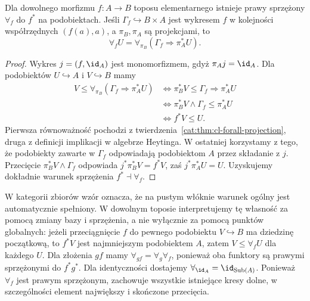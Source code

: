 \begin{twierdzenie}\label{cat:thm:cl-forall-adjoint}
Dla dowolnego morfizmu $f:A\to B$ toposu elementarnego istnieje prawy sprzężony $\forall_f$ do $f^*$ na podobiektach. Jeśli $\Gamma_f\hookrightarrow B\times A$ jest wykresem $f$ w kolejności współrzędnych $(f(a),a)$, a $\pi_B,\pi_A$ są projekcjami, to
\[
 \forall_f U=\forall_{\pi_B}(\Gamma_f\Rightarrow\pi_A^*U).
\]
\end{twierdzenie}
\begin{proof}
Wykres $j=(f,\id_A)$ jest monomorfizmem, gdyż $\pi_Aj=\id_A$. Dla podobiektów $U\hookrightarrow A$ i $V\hookrightarrow B$ mamy
\[
\begin{aligned}
 V\leq\forall_{\pi_B}(\Gamma_f\Rightarrow\pi_A^*U)
 &\iff \pi_B^*V\leq\Gamma_f\Rightarrow\pi_A^*U\\
 &\iff \pi_B^*V\wedge\Gamma_f\leq\pi_A^*U\\
 &\iff f^*V\leq U .
\end{aligned}
\]
Pierwsza równoważność pochodzi z twierdzenia~\ref{cat:thm:cl-forall-projection}, druga z definicji implikacji w algebrze Heytinga. W ostatniej korzystamy z tego, że podobiekty zawarte w $\Gamma_f$ odpowiadają podobiektom $A$ przez składanie z $j$. Przecięcie $\pi_B^*V\wedge\Gamma_f$ odpowiada $j^*\pi_B^*V=f^*V$, zaś $j^*\pi_A^*U=U$. Uzyskujemy dokładnie warunek sprzężenia $f^*\dashv\forall_f$.
\end{proof}

W kategorii zbiorów wzór oznacza, że na pustym włóknie warunek ogólny jest automatycznie spełniony. W dowolnym toposie interpretujemy tę własność za pomocą zmiany bazy i sprzężenia, a nie wyłącznie za pomocą punktów globalnych: jeżeli przeciągnięcie $f$ do pewnego podobiektu $V\hookrightarrow B$ ma dziedzinę początkową, to $f^*V$ jest najmniejszym podobiektem $A$, zatem $V\leq\forall_f U$ dla każdego $U$. Dla złożenia $gf$ mamy $\forall_{gf}=\forall_g\forall_f$, ponieważ oba funktory są prawymi sprzężonymi do $f^*g^*$. Dla identyczności dostajemy $\forall_{\id_A}=\id_{\operatorname{Sub}(A)}$. Ponieważ $\forall_f$ jest prawym sprzężonym, zachowuje wszystkie istniejące kresy dolne, w szczególności element największy i skończone przecięcia.

